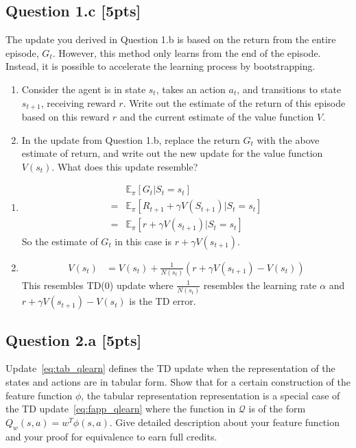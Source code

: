 \documentclass[12pt]{article}
\begin{document}
\subsection*{Question 1.c \textbf{[5pts]}}
The update you derived in Question 1.b is based on the return from the entire episode, $G_t$. However, this method only learns from the end of the episode. Instead, it is possible to accelerate the learning process by bootstrapping. 

\begin{enumerate}
    \item Consider the agent is in state $s_t$, takes an action $a_t$, and transitions to state $s_{t+1}$, receiving reward $r$. Write out the estimate of the return of this episode based on this reward $r$ and the current estimate of the value function $V$. 
    \item In the update from Question 1.b, replace the return $G_t$ with the above estimate of return, and write out the new update for the value function $V(s_t)$. What does this update resemble?
\end{enumerate}

\noindent
\begin{solution}
\begin{enumerate}
    \item 
    \begin{align*}
    &\mathbb{E}_\pi\left[G_t|S_t=s_t\right]\\
    =&\mathbb{E}_\pi\left[R_{t+1}+\gamma V(S_{t+1})|S_t=s_t\right]\\
    =&\mathbb{E}_\pi\left[r+\gamma V(s_{t+1})|S_t=s_t\right]
    \end{align*}
    So the estimate of $G_t$ in this case is $r+\gamma V(s_{t+1})$.
    \item 
    \begin{align*}
    V(s_t) &= V(s_t) + \frac{1}{N(s_t)}(r+\gamma V(s_{t+1})-V(s_t))
    \end{align*}
    This resembles TD(0) update where $\frac{1}{N(s_t)}$ resembles the learning rate $\alpha$ and $r+\gamma V(s_{t+1})-V(s_t)$ is the TD error.
\end{enumerate}
\end{solution}


\subsection*{Question 2.a \textbf{[5pts]}}
Update~\ref{eq:tab_qlearn} defines the TD update when the representation of the states and actions are in tabular form. Show that for a certain construction of the feature function $\phi$, the tabular representation representation is a special case of the TD update~\ref{eq:fapp_qlearn} where the function in $\mathcal Q$ is of the form $Q _w(s, a) = w ^T \phi(s, a)$. Give detailed description about your feature function and your proof for equivalence to earn full credits. \\
\end{document}

